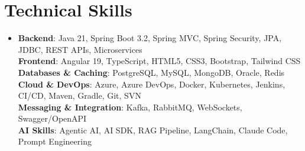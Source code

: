 \section{Technical Skills}
    \begin{itemize}[leftmargin=0.15in, label={}]
        \small\item{
            \textbf{Backend}: Java 21, Spring Boot 3.2, Spring MVC, Spring Security, JPA, JDBC, REST APIs, Microservices \\
            \textbf{Frontend}: Angular 19, TypeScript, HTML5, CSS3, Bootstrap, Tailwind CSS \\
            \textbf{Databases \& Caching}: PostgreSQL, MySQL, MongoDB, Oracle, Redis \\
            \textbf{Cloud \& DevOps}: Azure, Azure DevOps, Docker, Kubernetes, Jenkins, CI/CD, Maven, Gradle, Git, SVN \\
            \textbf{Messaging \& Integration}: Kafka, RabbitMQ, WebSockets, Swagger/OpenAPI \\
            \textbf{AI Skills}: Agentic AI, AI SDK, RAG Pipeline, LangChain, Claude Code, Prompt Engineering
        }
    \end{itemize}
